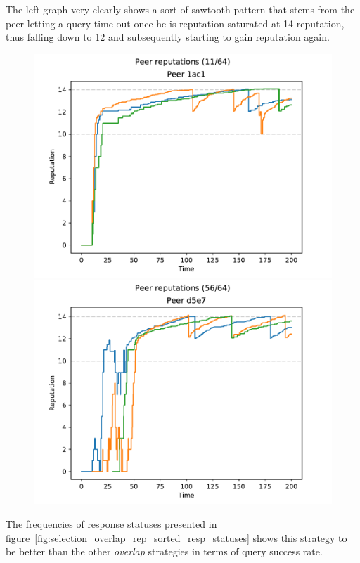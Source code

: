 The left graph very clearly shows a sort of sawtooth pattern that stems from the
peer letting a query time out once he is reputation saturated at 14 reputation,
thus falling down to 12 and subsequently starting to gain reputation again.

\begin{figure}[t]
\centering
\includegraphics[width=0.5\columnwidth]{figures/selection_overlap_rep_sorted_peer_reps_11_of_64}%
\includegraphics[width=0.5\columnwidth]{figures/selection_overlap_rep_sorted_peer_reps_56_of_64}
\label{fig:selection_overlap_rep_sorted_peer_reps}
\end{figure}

The frequencies of response statuses presented in
figure~\ref{fig:selection_overlap_rep_sorted_resp_statuses} shows this
strategy to be better than the other \emph{overlap} strategies in terms of query
success rate.


